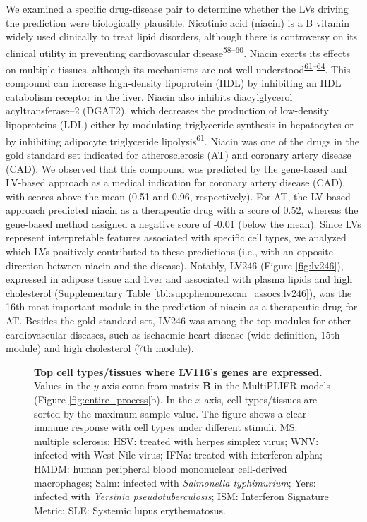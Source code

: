 \documentclass[
  a4paper,
]{article}
\begin{document}
We examined a specific drug-disease pair to determine whether the LVs driving the prediction were biologically plausible.
Nicotinic acid (niacin) is a B vitamin widely used clinically to treat lipid disorders, although there is controversy on its clinical utility in preventing cardiovascular disease\textsuperscript{\protect\hyperlink{ref-bRPc66OD}{58}--\protect\hyperlink{ref-ZGvG75Bj}{60}}.
Niacin exerts its effects on multiple tissues, although its mechanisms are not well understood\textsuperscript{\protect\hyperlink{ref-LVihFr3g}{61}--\protect\hyperlink{ref-13meq3Hgt}{64}}.
This compound can increase high-density lipoprotein (HDL) by inhibiting an HDL catabolism receptor in the liver.
Niacin also inhibits diacylglycerol acyltransferase--2 (DGAT2), which decreases the production of low-density lipoproteins (LDL) either by modulating triglyceride synthesis in hepatocytes or by inhibiting adipocyte triglyceride lipolysis\textsuperscript{\protect\hyperlink{ref-LVihFr3g}{61}}.
Niacin was one of the drugs in the gold standard set indicated for atherosclerosis (AT) and coronary artery disease (CAD).
We observed that this compound was predicted by the gene-based and LV-based approach as a medical indication for coronary artery disease (CAD), with scores above the mean (0.51 and 0.96, respectively).
For AT, the LV-based approach predicted niacin as a therapeutic drug with a score of 0.52, whereas the gene-based method assigned a negative score of -0.01 (below the mean).
Since LVs represent interpretable features associated with specific cell types, we analyzed which LVs positively contributed to these predictions (i.e., with an opposite direction between niacin and the disease).
Notably, LV246 (Figure \ref{fig:lv246}), expressed in adipose tissue and liver and associated with plasma lipids and high cholesterol (Supplementary Table \ref{tbl:sup:phenomexcan_assocs:lv246}), was the 16th most important module in the prediction of niacin as a therapeutic drug for AT.
Besides the gold standard set, LV246 was among the top modules for other cardiovascular diseases, such as ischaemic heart disease (wide definition, 15th module) and high cholesterol (7th module).

\begin{figure}
\hypertarget{fig:lv116:cell_types}{%
\centering

\caption{\textbf{Top cell types/tissues where LV116's genes are expressed.}
Values in the \(y\)-axis come from matrix \(\mathbf{B}\) in the MultiPLIER models (Figure \ref{fig:entire_process}b).
In the \(x\)-axis, cell types/tissues are sorted by the maximum sample value.
The figure shows a clear immune response with cell types under different stimuli.
MS: multiple sclerosis;
HSV: treated with herpes simplex virus;
WNV: infected with West Nile virus;
IFNa: treated with interferon-alpha;
HMDM: human peripheral blood mononuclear cell-derived macrophages;
Salm: infected with \emph{Salmonella typhimurium};
Yers: infected with \emph{Yersinia pseudotuberculosis};
ISM: Interferon Signature Metric;
SLE: Systemic lupus erythematosus.}\label{fig:lv116:cell_types}
}
\end{figure}
\end{document}
